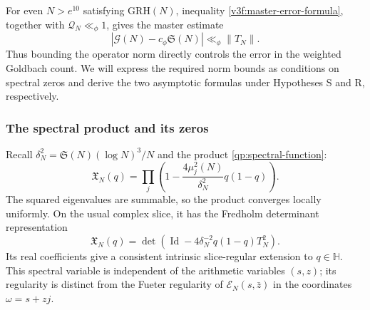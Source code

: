 \documentclass[12pt,a4paper]{amsart}
\numberwithin{equation}{section}
\theoremstyle{plain}
\theoremstyle{definition}
\theoremstyle{remark}
\begin{document}
For even $N>e^{10}$ satisfying $\mathrm{GRH}(N)$, inequality
\eqref{v3f:master-error-formula}, together with $\mathcal Q_N\ll_\phi1$,
gives the master estimate
\begin{equation}\label{v3f:master-estimate}
 |\mathcal G(N)-c_\phi\mathfrak S(N)|\ll_\phi\|T_N\|.
\end{equation}
Thus bounding the operator norm directly controls the error in the
weighted Goldbach count. We will express the required norm bounds as
conditions on spectral zeros and derive the two asymptotic formulas
under Hypotheses S and R, respectively.

\subsubsection{The spectral product and its zeros}
\label{story:riemann-spectrum}

Recall $\delta_N^2=\mathfrak S(N)(\log N)^3/N$ and the product
\eqref{qp:spectral-function}:
\[
 \mathfrak X_N(q)=\prod_j
 \left(1-\frac{4\mu_j^2(N)}{\delta_N^2}q(1-q)\right).
\]
The squared eigenvalues are summable, so the product converges
locally uniformly. On the usual complex slice, it has the Fredholm
determinant representation
\[
 \mathfrak X_N(q)=\det\!\left(\operatorname{Id}
              -4\delta_N^{-2}q(1-q)T_N^2\right).
\]
Its real coefficients give a consistent intrinsic slice-regular
extension to $q\in\mathbb H$. This spectral variable is independent
of the arithmetic variables $(s,z)$; its regularity is distinct
from the Fueter regularity of $\mathscr E_N(s,\bar z)$ in the
coordinates $\omega=s+zj$.
\end{document}
